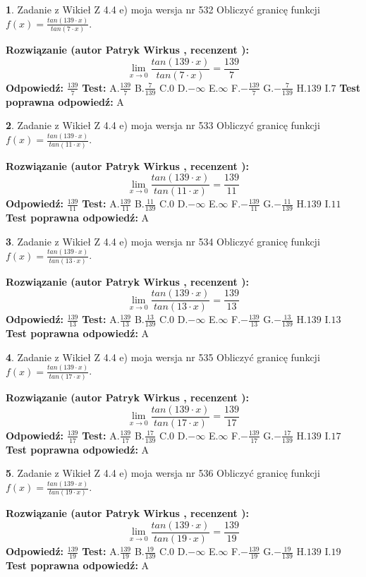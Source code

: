 \documentclass[12pt, a4paper]{article}
\theoremstyle{definition} %
\newtheorem{zad}{}
\newcommand{\zadStart}[1]{\begin{zad}#1\newline}
\newcommand{\zadStop}{\end{zad}}
\newcommand{\rozwStart}[2]{\noindent \textbf{Rozwiązanie (autor #1 , recenzent #2): }\newline}
\newcommand{\rozwStop}{\newline}
\newcommand{\odpStart}{\noindent \textbf{Odpowiedź:}\newline}
\newcommand{\odpStop}{\newline}
\newcommand{\testStart}{\noindent \textbf{Test:}\newline}
\newcommand{\testStop}{\newline}
\newcommand{\kluczStart}{\noindent \textbf{Test poprawna odpowiedź:}\newline}
\newcommand{\kluczStop}{\newline}
\begin{document}
\zadStart{Zadanie z Wikieł Z 4.4 e) moja wersja nr 532}
Obliczyć granicę funkcji $f(x)=\frac{tan(139\cdot x)}{tan(7\cdot x)}$.
\zadStop
\rozwStart{Patryk Wirkus}{}
$$\lim\limits_{x\to 0}\frac{tan(139\cdot x)}{tan(7\cdot x)}=
\frac{139}{7}$$
\rozwStop
\odpStart
$\frac{139}{7}$
\odpStop
\testStart
A.$\frac{139}{7}$
B.$\frac{7}{139}$
C.$0$
D.$-\infty$
E.$\infty$
F.$-\frac{139}{7}$
G.$-\frac{7}{139}$
H.$139$
I.$7$
\testStop
\kluczStart
A
\kluczStop



\zadStart{Zadanie z Wikieł Z 4.4 e) moja wersja nr 533}
Obliczyć granicę funkcji $f(x)=\frac{tan(139\cdot x)}{tan(11\cdot x)}$.
\zadStop
\rozwStart{Patryk Wirkus}{}
$$\lim\limits_{x\to 0}\frac{tan(139\cdot x)}{tan(11\cdot x)}=
\frac{139}{11}$$
\rozwStop
\odpStart
$\frac{139}{11}$
\odpStop
\testStart
A.$\frac{139}{11}$
B.$\frac{11}{139}$
C.$0$
D.$-\infty$
E.$\infty$
F.$-\frac{139}{11}$
G.$-\frac{11}{139}$
H.$139$
I.$11$
\testStop
\kluczStart
A
\kluczStop



\zadStart{Zadanie z Wikieł Z 4.4 e) moja wersja nr 534}
Obliczyć granicę funkcji $f(x)=\frac{tan(139\cdot x)}{tan(13\cdot x)}$.
\zadStop
\rozwStart{Patryk Wirkus}{}
$$\lim\limits_{x\to 0}\frac{tan(139\cdot x)}{tan(13\cdot x)}=
\frac{139}{13}$$
\rozwStop
\odpStart
$\frac{139}{13}$
\odpStop
\testStart
A.$\frac{139}{13}$
B.$\frac{13}{139}$
C.$0$
D.$-\infty$
E.$\infty$
F.$-\frac{139}{13}$
G.$-\frac{13}{139}$
H.$139$
I.$13$
\testStop
\kluczStart
A
\kluczStop



\zadStart{Zadanie z Wikieł Z 4.4 e) moja wersja nr 535}
Obliczyć granicę funkcji $f(x)=\frac{tan(139\cdot x)}{tan(17\cdot x)}$.
\zadStop
\rozwStart{Patryk Wirkus}{}
$$\lim\limits_{x\to 0}\frac{tan(139\cdot x)}{tan(17\cdot x)}=
\frac{139}{17}$$
\rozwStop
\odpStart
$\frac{139}{17}$
\odpStop
\testStart
A.$\frac{139}{17}$
B.$\frac{17}{139}$
C.$0$
D.$-\infty$
E.$\infty$
F.$-\frac{139}{17}$
G.$-\frac{17}{139}$
H.$139$
I.$17$
\testStop
\kluczStart
A
\kluczStop



\zadStart{Zadanie z Wikieł Z 4.4 e) moja wersja nr 536}
Obliczyć granicę funkcji $f(x)=\frac{tan(139\cdot x)}{tan(19\cdot x)}$.
\zadStop
\rozwStart{Patryk Wirkus}{}
$$\lim\limits_{x\to 0}\frac{tan(139\cdot x)}{tan(19\cdot x)}=
\frac{139}{19}$$
\rozwStop
\odpStart
$\frac{139}{19}$
\odpStop
\testStart
A.$\frac{139}{19}$
B.$\frac{19}{139}$
C.$0$
D.$-\infty$
E.$\infty$
F.$-\frac{139}{19}$
G.$-\frac{19}{139}$
H.$139$
I.$19$
\testStop
\kluczStart
A
\kluczStop
\end{document}
